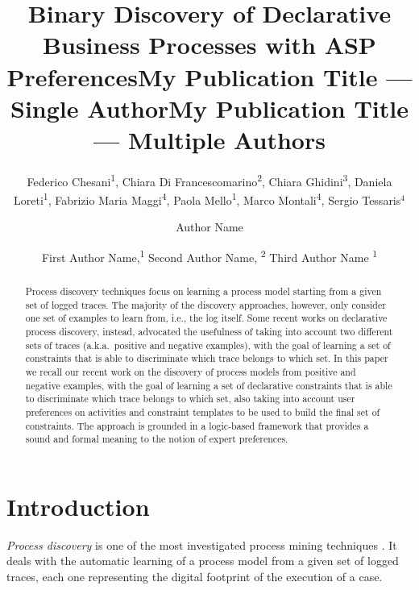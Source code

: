 \documentclass[letterpaper]{article} %
\title{Binary Discovery of Declarative Business Processes with ASP Preferences}
\author{
	Federico Chesani\textsuperscript{\rm 1}, 
	Chiara Di Francescomarino\textsuperscript{\rm 2}, 
	Chiara Ghidini\textsuperscript{\rm 3}, 
	Daniela Loreti\textsuperscript{\rm 1}, 
	Fabrizio Maria Maggi\textsuperscript{\rm 4}, 
	Paola Mello\textsuperscript{\rm 1}, 
	Marco Montali\textsuperscript{\rm 4}, Sergio Tessaris$^4$\\
}
\title{My Publication Title --- Single Author}
\author {
    Author Name
}
\title{My Publication Title --- Multiple Authors}
\author {
    First Author Name,\textsuperscript{\rm 1}
    Second Author Name, \textsuperscript{\rm 2}
    Third Author Name \textsuperscript{\rm 1}
}
\theoremstyle{definition}
\begin{document}
\maketitle

\begin{abstract}
Process discovery techniques focus on learning a process model starting from a given set of logged traces. The majority of the discovery approaches, however, only consider one set of examples to learn from, i.e., the log itself. Some recent works on declarative process discovery, instead, advocated the usefulness of taking into account two different sets of traces (a.k.a.\ positive and negative examples), with the goal of learning a set of constraints that is able to discriminate which trace belongs to which set.
In this paper we recall our recent work on the discovery of process models from positive and negative examples, with the goal of learning a set of declarative constraints that is able to discriminate which trace belongs to which set, also taking into account user preferences on  activities and constraint templates to be used to build the final set of constraints. The approach is grounded in a logic-based framework that provides a sound and formal meaning to the notion of expert preferences. 
\end{abstract}

\section{Introduction}

\emph{Process discovery} is one of the most investigated process mining techniques \cite{2012-Aalst}. It deals with the automatic learning of a process model from a given set of logged traces, each one representing the digital footprint of the execution of a case.
\end{document}
